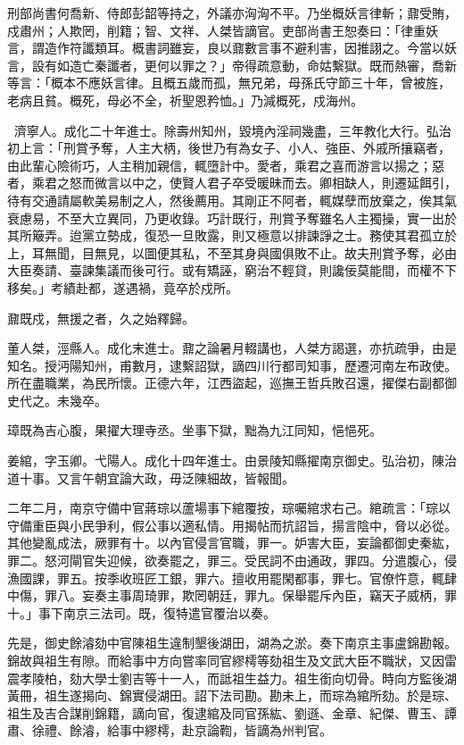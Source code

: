 \begin{pinyinscope}
刑部尚書何喬新、侍郎彭韶等持之，外議亦洶洶不平。乃坐概妖言律斬；鼐受賄，戍肅州；人欺罔，削籍；智、文祥、人桀皆謫官。吏部尚書王恕奏曰：「律重妖言，謂造作符讖類耳。概書詞雖妄，良以鼐數言事不避利害，因推詡之。今當以妖言，設有如造亡秦讖者，更何以罪之？」帝得疏意動，命姑繫獄。既而熱審，喬新等言：「概本不應妖言律。且概五歲而孤，無兄弟，母孫氏守節三十年，曾被旌，老病且貧。概死，母必不全，祈聖恩矜恤。」乃減概死，戍海州。

，濟寧人。成化二十年進士。除壽州知州，毀境內淫祠幾盡，三年教化大行。弘治初上言：「刑賞予奪，人主大柄，後世乃有為女子、小人、強臣、外戚所攘竊者，由此輩心險術巧，人主稍加親信，輒墮計中。愛者，乘君之喜而游言以揚之；惡者，乘君之怒而微言以中之，使賢人君子卒受暖昧而去。卿相缺人，則遷延餌引，待有交通請屬軟美易制之人，然後薦用。其剛正不阿者，輒媒孽而放棄之，俟其氣衰慮易，不至大立異同，乃更收錄。巧計既行，刑賞予奪雖名人主獨操，實一出於其所簸弄。迨黨立勢成，復恐一旦敗露，則又極意以排諫諍之士。務使其君孤立於上，耳無聞，目無見，以圖便其私，不至其身與國俱敗不止。故夫刑賞予奪，必由大臣奏請、臺諫集議而後可行。或有矯誣，窮治不輕貸，則讒佞莫能間，而權不下移矣。」考績赴都，遂遇禍，竟卒於戍所。

鼐既戍，無援之者，久之始釋歸。

董人桀，涇縣人。成化末進士。鼐之論暑月輟講也，人桀方謁選，亦抗疏爭，由是知名。授沔陽知州，甫數月，逮繫詔獄，謫四川行都司知事，歷遷河南左布政使。所在盡職業，為民所懷。正德六年，江西盜起，巡撫王哲兵敗召還，擢傑右副都御史代之。未幾卒。

璋既為吉心腹，果擢大理寺丞。坐事下獄，黜為九江同知，悒悒死。

姜綰，字玉卿。弋陽人。成化十四年進士。由景陵知縣擢南京御史。弘治初，陳治道十事。又言午朝宜論大政，毋泛陳細故，皆報聞。

二年二月，南京守備中官蔣琮以蘆場事下綰覆按，琮囑綰求右己。綰疏言：「琮以守備重臣與小民爭利，假公事以適私情。用揭帖而抗詔旨，揚言陰中，脅以必從。其他變亂成法，厥罪有十。以內官侵言官職，罪一。妒害大臣，妄論都御史秦紘，罪二。怒河閘官失迎候，欲奏罷之，罪三。受民詞不由通政，罪四。分遣腹心，侵漁國課，罪五。按季收班匠工銀，罪六。擅收用罷閑都事，罪七。官僚忤意，輒肆中傷，罪八。妄奏主事周琦罪，欺罔朝廷，罪九。保舉罷斥內臣，竊天子威柄，罪十。」事下南京三法司。既，復特遣官覆治以奏。

先是，御史餘濬劾中官陳祖生違制墾後湖田，湖為之淤。奏下南京主事盧錦勘報。錦故與祖生有隙。而給事中方向嘗率同官繆樗等劾祖生及文武大臣不職狀，又因雷震孝陵柏，劾大學士劉吉等十一人，而詆祖生益力。祖生銜向切骨。時向方監後湖黃冊，祖生遂揭向、錦實侵湖田。詔下法司勘。勘未上，而琮為綰所劾。於是琮、祖生及吉合謀削錦籍，謫向官，復逮綰及同官孫紘、劉遜、金章、紀傑、曹玉、譚肅、徐禮、餘濬，給事中繆樗，赴京論鞫，皆謫為州判官。


\end{pinyinscope}
